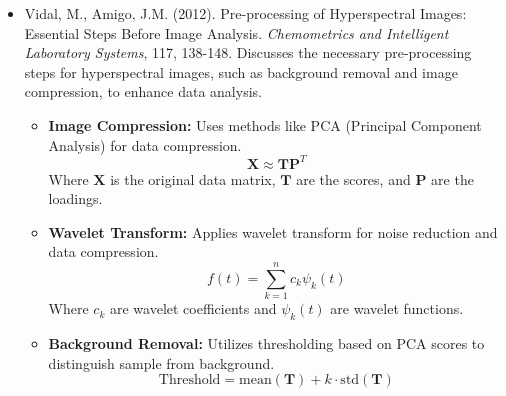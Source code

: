 \documentclass[10pt,svgnames,fragile]{beamer}
\begin{document}
\begin{frame}{}
\tiny
\begin{itemize}

    \item Vidal, M., Amigo, J.M. (2012). Pre-processing of Hyperspectral Images: Essential Steps Before Image Analysis. \textit{Chemometrics and Intelligent Laboratory Systems}, 117, 138-148. \href{https://www.sciencedirect.com/science/article/pii/S0169743912001503}{\color{blue}{DOI: 10.1016/j.chemolab.2012.05.009}}
    {\color{gray}Discusses the necessary pre-processing steps for hyperspectral images, such as background removal and image compression, to enhance data analysis.}
    \begin{itemize} \tiny
    \item \textbf{Image Compression:} Uses methods like PCA (Principal Component Analysis) for data compression.
    \[
    \mathbf{X} \approx \mathbf{T} \mathbf{P}^T
    \]
    Where \( \mathbf{X} \) is the original data matrix, \( \mathbf{T} \) are the scores, and \( \mathbf{P} \) are the loadings.
    \item \textbf{Wavelet Transform:} Applies wavelet transform for noise reduction and data compression.
    \[
    f(t) = \sum_{k=1}^{n} c_k \psi_k(t)
    \]
    Where \( c_k \) are wavelet coefficients and \( \psi_k(t) \) are wavelet functions.
    \item \textbf{Background Removal:} Utilizes thresholding based on PCA scores to distinguish sample from background.
    \[
    \text{Threshold} = \text{mean}(\mathbf{T}) + k \cdot \text{std}(\mathbf{T})
    \]
\end{itemize}
    
\end{itemize}
\end{frame}
\end{document}

